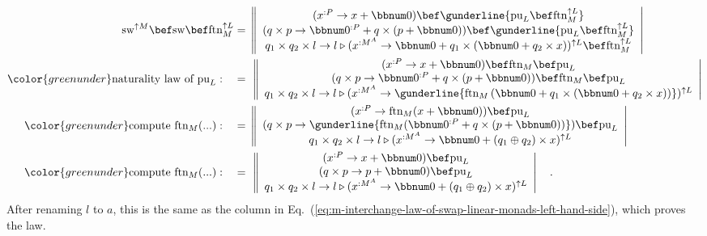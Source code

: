 \begin{align*}
\text{sw}^{\uparrow M}\bef\text{sw}\bef\text{ftn}_{M}^{\uparrow L} & =\,\left\Vert \begin{array}{c}
(x^{:P}\rightarrow x+\bbnum 0)\bef\gunderline{\text{pu}_{L}\bef\text{ftn}_{M}^{\uparrow L}}\\
(q\times p\rightarrow\bbnum 0^{:P}+q\times\left(p+\bbnum 0\right))\bef\gunderline{\text{pu}_{L}\bef\text{ftn}_{M}^{\uparrow L}}\\
q_{1}\times q_{2}\times l\rightarrow l\triangleright(x^{:M^{A}}\rightarrow\bbnum 0+q_{1}\times(\bbnum 0+q_{2}\times x))^{\uparrow L}\bef\text{ftn}_{M}^{\uparrow L}
\end{array}\right|\\
{\color{greenunder}\text{naturality law of }\text{pu}_{L}:}\quad & =\,\,\left\Vert \begin{array}{c}
(x^{:P}\rightarrow x+\bbnum 0)\bef\text{ftn}_{M}\bef\text{pu}_{L}\\
(q\times p\rightarrow\bbnum 0^{:P}+q\times\left(p+\bbnum 0\right))\bef\text{ftn}_{M}\bef\text{pu}_{L}\\
q_{1}\times q_{2}\times l\rightarrow l\triangleright(x^{:M^{A}}\rightarrow\gunderline{\text{ftn}_{M}\left(\bbnum 0+q_{1}\times(\bbnum 0+q_{2}\times x)\right)})^{\uparrow L}
\end{array}\right|\\
{\color{greenunder}\text{compute }\text{ftn}_{M}(...):}\quad & =\,\left\Vert \begin{array}{c}
(x^{:P}\rightarrow\text{ftn}_{M}(x+\bbnum 0))\bef\text{pu}_{L}\\
(q\times p\rightarrow\gunderline{\text{ftn}_{M}(\bbnum 0^{:P}+q\times\left(p+\bbnum 0\right))})\bef\text{pu}_{L}\\
q_{1}\times q_{2}\times l\rightarrow l\triangleright(x^{:M^{A}}\rightarrow\bbnum 0+\left(q_{1}\oplus q_{2}\right)\times x)^{\uparrow L}
\end{array}\right|\\
{\color{greenunder}\text{compute }\text{ftn}_{M}(...):}\quad & =\,\,\left\Vert \begin{array}{c}
(x^{:P}\rightarrow x+\bbnum 0)\bef\text{pu}_{L}\\
(q\times p\rightarrow p+\bbnum 0)\bef\text{pu}_{L}\\
q_{1}\times q_{2}\times l\rightarrow l\triangleright(x^{:M^{A}}\rightarrow\bbnum 0+\left(q_{1}\oplus q_{2}\right)\times x)^{\uparrow L}
\end{array}\right|\quad.
\end{align*}
After renaming $l$ to $a$, this is the same as the column in Eq.~(\ref{eq:m-interchange-law-of-swap-linear-monads-left-hand-side}),
which proves the law.

